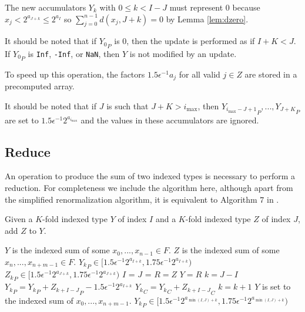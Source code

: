     The new accumulators $Y_k$ with $0 \leq k < I - J$ must represent 0 because $x_j < 2^{a_{J + k}} \leq 2^{a_I}$ so $\sum\limits_{j = 0}^{n - 1} d(x_j, J + k) = 0$ by Lemma \ref{lem:dzero}.

    It should be noted that if ${Y_0}_P$ is 0, then the update is performed as if $I + K < J$. If ${Y_0}_P$ is \texttt{Inf}, \texttt{-Inf}, or \texttt{NaN}, then $Y$ is not modified by an update.

    To speed up this operation, the factors $1.5  \epsilon^{-1}  a_j$ for all valid $j \in Z$ are stored in a precomputed array.

    It should be noted that if $J$ is such that $J + K > i_{\max}$, then ${Y_{i_{\max} - J + 1}}_P, ...,  {Y_{J + K}}_P$ are set to $1.5 \epsilon^{-1}2^{a_{i_{\max}}}$ and the values in these accumulators are ignored.

  \subsection{Reduce}
    \label{sec:primitiveops_reduce}
    An operation to produce the sum of two indexed types is necessary to perform a reduction. For completeness we include the algorithm here, although apart from the simplified renormalization algorithm, it is equivalent to Algorithm $7$ in \cite{repsum}.

    \begin{samepage}
    \begin{alg}
      Given a $K$-fold indexed type $Y$ of index $I$ and a $K$-fold indexed type $Z$ of index $J$, add $Z$ to $Y$.
      \begin{algorithmic}[1]
        \Ensure
          \Statex $Y$ is the indexed sum of some $x_0, ..., x_{n - 1} \in F$.
          \Statex $Z$ is the indexed sum of some $x_n, ..., x_{n + m - 1} \in F$.
          \Statex ${Y_k}_P \in [1.5  \epsilon^{-1} 2^{a_{I + k}}, 1.75  \epsilon^{-1} 2^{a_{I + k}})$
          \Statex ${Z_k}_P \in [1.5  \epsilon^{-1} 2^{a_{J + k}}, 1.75  \epsilon^{-1} 2^{a_{J + k}})$
          \State $I$ = 
          \State $J$ = 
            \State $R = Z$
            \State {}
            \State $Y = R$
          \EndIf
          \State $k = J - I$
            \State ${Y_{k}}_P = {Y_{k}}_P + {Z_{k + I - J}}_P - 1.5  \epsilon^{-1}  2^{a_{I + k}}$
            \State ${Y_{k}}_C = {Y_{k}}_C + {Z_{k + I - J}}_C$
            \State $k = k + 1$
          \EndWhile
          \State {}
        \EndFunction
        \Ensure
          \Statex $Y$ is set to the indexed sum of $x_0, ..., x_{n + m - 1}$.
          \Statex ${Y_k}_P \in [1.5  \epsilon^{-1} 2^{a_{\min(I, J) + k}}, 1.75  \epsilon^{-1} 2^{a_{\min(I, J) + k}})$
      \end{algorithmic}
      \label{alg:reduce}
    \end{alg}
    \end{samepage}

